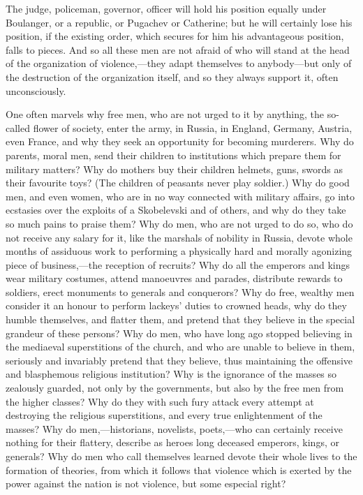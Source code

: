 \documentclass{book}
\begin{document}
The judge, policeman, governor, officer will hold his position equally under Boulanger, or a republic, or Pugachev or Catherine; but he will certainly lose his position, if the existing order, which secures for him his advantageous position, falls to pieces. And so all these men are not afraid of who will stand at the head of the organization of violence,—they adapt themselves to anybody—but only of the destruction of the organization itself, and so they always support it, often unconsciously.

One often marvels why free men, who are not urged to it by anything, the so-called flower of society, enter the army, in Russia, in England, Germany, Austria, even France, and why they seek an opportunity for becoming murderers. Why do parents, moral men, send their children to institutions which prepare them for military matters? Why do mothers buy their children helmets, guns, swords as their favourite toys? (The children of peasants never play soldier.) Why do good men, and even women, who are in no way connected with military affairs, go into ecstasies over the exploits of a Skobelevski and of others, and why do they take so much pains to praise them? Why do men, who are not urged to do so, who do not receive any salary for it, like the marshals of nobility in Russia, devote whole months of assiduous work to performing a physically hard and morally agonizing piece of business,—the reception of recruits? Why do all the emperors and kings wear military costumes, attend manoeuvres and parades, distribute rewards to soldiers, erect monuments to generals and conquerors? Why do free, wealthy men consider it an honour to perform lackeys’ duties to crowned heads, why do they humble themselves, and flatter them, and pretend that they believe in the special grandeur of these persons? Why do men, who have long ago stopped believing in the mediaeval superstitions of the church, and who are unable to believe in them, seriously and invariably pretend that they believe, thus maintaining the offensive and blasphemous religious institution? Why is the ignorance of the masses so zealously guarded, not only by the governments, but also by the free men from the higher classes? Why do they with such fury attack every attempt at destroying the religious superstitions, and every true enlightenment of the masses? Why do men,—historians, novelists, poets,—who can certainly receive nothing for their flattery, describe as heroes long deceased emperors, kings, or generals? Why do men who call themselves learned devote their whole lives to the formation of theories, from which it follows that violence which is exerted by the power against the nation is not violence, but some especial right?
\end{document}
